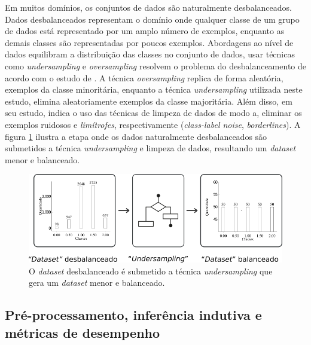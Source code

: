 Em muitos domínios, os conjuntos de dados são naturalmente desbalanceados. 
Dados desbalanceados representam o domínio onde qualquer classe de um grupo 
de dados está representado por um amplo número de exemplos, enquanto as demais 
classes são representadas por poucos exemplos. Abordagens ao nível de dados 
equilibram a distribuição das classes no conjunto de dados, usar técnicas como 
\textit{undersampling} e \textit{oversampling} resolvem o problema do 
desbalanceamento de acordo com o estudo de . A 
técnica \textit{oversampling} replica de forma aleatória, exemplos da classe 
minoritária, enquanto a técnica \textit{undersampling} utilizada neste estudo, 
elimina aleatoriamente exemplos da classe majoritária. Além disso, 
 em seu estudo, indica o uso das técnicas de 
limpeza de dados de modo a, eliminar os exemplos ruidosos e \textit{limítrofes}, 
respectivamente (\textit{class-label noise}, \textit{borderlines}). A figura 
\ref{figure:metodologia_2} ilustra a etapa onde os dados naturalmente 
desbalanceados são submetidos a técnica \textit{undersampling} e limpeza de 
dados, resultando um \textit{dataset} menor e balanceado.

\begin{figure}[H]
\begin{center}
    \includegraphics[scale=0.60]{images/metodologia_2.png}
\end{center}
\caption{O \textit{dataset} desbalanceado é submetido a técnica
\textit{undersampling} que gera um \textit{dataset} menor e balanceado.}
\label{figure:metodologia_2}
\end{figure}

\subsection{Pré-processamento, inferência indutiva e métricas de desempenho}
\label{subsection:pre_processamento}

